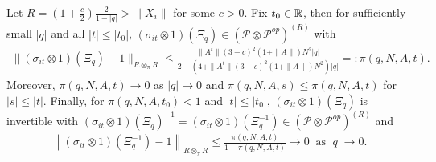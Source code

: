 \begin{prop}\label{Xi_invertible}
Let $R=\left(1+\frac{c}{2}\right)\frac{2}{1-|q|}>\|X_i\|$ for some $c>0$. Fix $t_0\in\mathbb{R}$, then for sufficiently small $|q|$ and all $|t|\leq |t_0|$, $(\sigma_{it}\otimes 1)(\Xi_q)\in \left(\mathscr{P}\otimes\mathscr{P}^{op}\right)^{(R)}$ with
	\begin{align*}
		\| (\sigma_{it}\otimes1)(\Xi_q) - 1\|_{R\otimes_\pi R} \leq \frac{\|A^{t}\|(3+c)^2(1+\|A\|)N^2|q|}{2- \left(4+ \|A^{t}\|(3+c)^2(1+\|A\|)N^2\right)|q|}=:\pi(q,N,A,t).
	\end{align*}
Moreover, $\pi(q,N,A,t)\rightarrow 0$ as $|q|\rightarrow 0$ and $\pi(q,N,A,s)\leq\pi(q,N,A,t)$ for $|s|\leq |t|$. Finally, for $\pi(q,N,A,t_0)<1$ and $|t|\leq |t_0|$, $(\sigma_{it}\otimes 1)(\Xi_q)$ is invertible with $(\sigma_{it}\otimes 1)(\Xi_q)^{-1}=(\sigma_{it}\otimes 1)(\Xi_q^{-1})\in\left(\mathscr{P}\otimes\mathscr{P}^{op}\right)^{(R)}$ and
	\begin{align*}
		\left\| (\sigma_{it}\otimes 1)(\Xi_q^{-1}) -1 \right\|_{R\otimes_\pi R} \leq \frac{\pi(q,N,A,t)}{1-\pi(q,N,A,t)}\longrightarrow 0\	\text{ as }|q|\rightarrow 0.
	\end{align*}
\end{prop}
